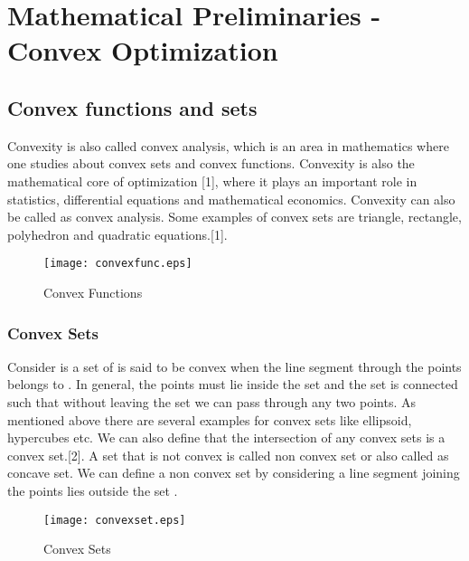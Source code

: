 

\section{Mathematical Preliminaries - Convex Optimization}

\subsection{Convex functions and sets}
Convexity is also called convex analysis, which is an area in mathematics where one studies about convex sets and convex functions. Convexity is also the mathematical core of optimization [1], where it plays an important role in statistics, differential equations and mathematical economics. Convexity can also be called as convex analysis. Some examples of convex sets are triangle, rectangle, polyhedron and quadratic equations.[1]. 
\begin{figure}[h]
	\begin{center}
		\texttt{[image: convexfunc.eps]}
		\caption{Convex Functions}
	\end{center}
\end{figure}
\subsubsection{Convex Sets}
Consider  is a set of  is said to be convex when the line segment through the points  belongs to . In general, the points must lie inside the set and the set is connected such that without leaving the set we can pass through any two points. As mentioned above there are several examples for convex sets like ellipsoid, hypercubes etc. We can also define that the intersection of any convex sets is a convex set.[2]. 
A set that is not convex is called non convex set or also called as concave set. We can define a non convex set by considering a line segment joining the points  lies outside the set .
\begin{figure}[h]
	\begin{center}
		\texttt{[image: convexset.eps]}
		\caption{Convex Sets}
	\end{center}
\end{figure}

